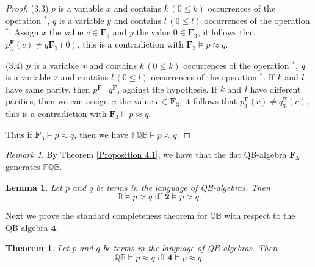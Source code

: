 \documentclass[12pt]{amsart}
\newtheorem{theorem}{Theorem}[section]
\newtheorem{lemma}{Lemma}[section]
\theoremstyle{definition}
\theoremstyle{remark}
\newtheorem{remark}{Remark}[section]
\numberwithin{equation}{section}
\begin{document}
\begin{proof}
(3.3) $p$ is a variable $x$ and contains $k\,(0\leq k)$ occurrences of the operation $^{*}$, $q$ is a variable $y$ and contains $l\,(0\leq l)$ occurrences of the operation $^{*}$. Assign $x$ the value $c\in \mathbf{F}_{3}$ and $y$ the value $0\in \mathbf{F}_{3}$, it follows that $p^\mathbf{F}_{3}(c)\neq q\mathbf{F}_{3}(0)$, this is a contradiction with $\mathrm{\mathbf{F}_{3}}\models p\approx q$.

(3.4) $\emph{p}$ is a variable $\emph{x}$ and contains $k\,(0\leq k)$ occurrences of the operation $^{*}$, $\emph{q}$ is a variable $\emph{x}$ and contains $l\,(0\leq l)$ occurrences of the operation $^{*}$. If $\emph{k}$ and $\emph{l}$ have same parity, then $p^\mathbf{F}$=$q^\mathbf{F}$, against the hypothesis. If $\emph{k}$ and $\emph{l}$ have different parities, then we can assign $\emph{x}$ the value $c\in \mathbf{F}_{3}$, it follows that $p^\mathbf{F}_{3}(c)\neq q^\mathbf{F}_{3}(c)$, this is a contradiction with $\mathrm{\mathbf{F}_{3}}\models p\approx q$.

Thus if $\mathrm{\mathbf{F}_{3}}\models p\approx q$, then we have $\mathbb{FQB}\models p\approx q$.
\end{proof}

\begin{remark}\label{FQB variety}
By Theorem \ref{Proposition 4.1}, we have that the flat QB-algebra $\mathrm{\mathbf{F}_{3}}$ generates $\mathbb{FQB}$.
\end{remark}

\begin{lemma}\label{Lemma 4.2}\emph{\cite{course}}
Let $p$ and $q$ be terms in the language of QB-algebras. Then
$$
\mathbb{B}\models p\approx q  \; \mathrm{iff}  \;  \mathbf{2}\models p \approx q.
$$
\end{lemma}

Next we prove the standard completeness theorem for $\mathbb{QB}$ with respect to the QB-algebra $\mathbf{4}$.

\begin{theorem}\label{Theorem 2}
Let $p$ and $q$ be terms in the language of QB-algebras. Then
$$
\mathbb{QB}\models p\approx q  \; \mathrm{iff} \; \mathbf{4}\models p \approx q.
$$
\end{theorem}
\end{document}
